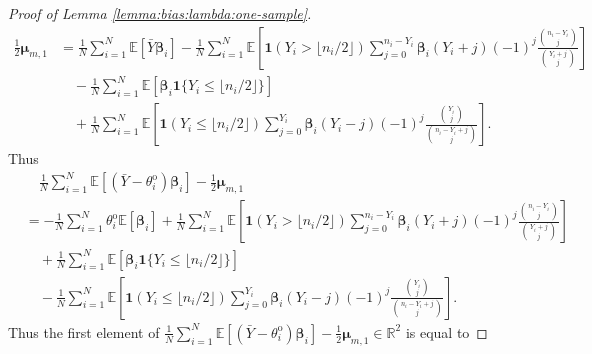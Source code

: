 \documentclass[12pt,letterpaper]{article}
\begin{document}
\begin{proof}[Proof of Lemma \ref{lemma:bias:lambda:one-sample}]
$$\begin{array}{rl}
\displaystyle\frac{1}{2}\boldsymbol{\mu}_{m,1}\!\!\!\!&\displaystyle=\frac{1}{N}\sum_{i=1}^N\mathbb{E}\left[\bar{Y}\boldsymbol{\beta}_i\right]-\frac{1}{N}\sum_{i=1}^N\mathbb{E}\left[\mathbf{1}(Y_{i} > \lfloor n_i/2\rfloor)\!\!\!\sum_{j=0}^{n_{i}-Y_{i}}\!\!\boldsymbol{\beta}_i(Y_i+j)(-1)^{j}\frac{\binom{n_i-Y_i}{j}}{\binom{Y_i+j}{j}}\right]\\
&\quad\displaystyle-\frac{1}{N}\sum_{i=1}^N\mathbb{E}\left[\boldsymbol{\beta}_i\mathbf{1}\{Y_i\leq \lfloor n_i/2\rfloor\}\right]\\
&\quad\displaystyle+\frac{1}{N}\sum_{i=1}^N\mathbb{E}\left[\mathbf{1}(Y_{i}\leq \lfloor n_i/2\rfloor)\sum_{j=0}^{Y_{i}}\boldsymbol{\beta}_i(Y_i-j)(-1)^{j}\frac{\binom{Y_i}{j}}{\binom{n_i-Y_i+j}{j}}\right].
\end{array}$$
Thus 
\begin{equation}\label{eq:bias:one-sample}
\begin{array}{rl}
&\quad\displaystyle\frac{1}{N}\sum_{i=1}^N\mathbb{E}\left[\left(\bar{Y}-\theta_i^{\mathrm{o}}\right)\boldsymbol{\beta}_i\right]-\frac{1}{2}\boldsymbol{\mu}_{m,1}\\
&\displaystyle=-\frac{1}{N}\sum_{i=1}^N\theta_i^{\mathrm{o}}\mathbb{E}\left[\boldsymbol{\beta}_i\right]+\frac{1}{N}\sum_{i=1}^N\mathbb{E}\left[\mathbf{1}(Y_{i} > \lfloor n_i/2\rfloor)\!\!\!\sum_{j=0}^{n_{i}-Y_{i}}\!\!\boldsymbol{\beta}_i(Y_i+j)(-1)^{j}\frac{\binom{n_i-Y_i}{j}}{\binom{Y_i+j}{j}}\right]\\
&\displaystyle\quad+\frac{1}{N}\sum_{i=1}^N\mathbb{E}\left[\boldsymbol{\beta}_i\mathbf{1}\{Y_i\leq \lfloor n_i/2\rfloor\}\right]\\
&\displaystyle\quad-\frac{1}{N}\sum_{i=1}^N\mathbb{E}\left[\mathbf{1}(Y_{i}\leq \lfloor n_i/2\rfloor)\sum_{j=0}^{Y_{i}}\boldsymbol{\beta}_i(Y_i-j)(-1)^{j}\frac{\binom{Y_i}{j}}{\binom{n_i-Y_i+j}{j}}\right].
\end{array}
\end{equation}
Thus the first element of $\displaystyle\frac{1}{N}\sum_{i=1}^N\mathbb{E}\left[\left(\bar{Y}-\theta_i^{\mathrm{o}}\right)\boldsymbol{\beta}_i\right]-\frac{1}{2}\boldsymbol{\mu}_{m,1}\in\mathbb{R}^2$ is equal to 


\end{proof}
\end{document}
